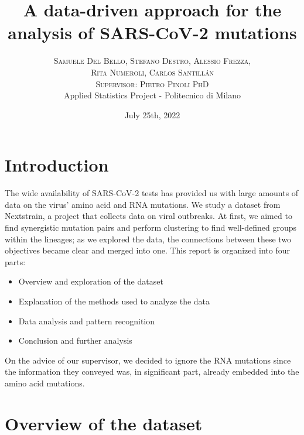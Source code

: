 \documentclass[twoside,twocolumn]{article}
\title{A data-driven approach for the analysis of SARS-CoV-2 mutations} %
\author{%
	\textsc{Samuele Del Bello, Stefano Destro, Alessio Frezza,}\\
	\textsc{Rita Numeroli, Carlos Santillán} \\[1ex] %
	\textsc{Supervisor: Pietro Pinoli PhD}\\
	\normalsize  Applied Statistics Project - Politecnico di Milano \\
}
\date{July 25th, 2022}
\begin{document}
	\maketitle
	
	\section{Introduction}
	
	The wide availability of SARS-CoV-2 tests has provided us with large amounts of data on the virus' amino acid and RNA mutations. We study a dataset from Nextstrain\cite{nextstrainbook}, a project that collects data on viral outbreaks. At first, we aimed to find synergistic mutation pairs and perform clustering to find well-defined groups within the lineages; as we explored the data, the connections between these two objectives became clear and merged into one. This report is organized into four parts:
	\begin{itemize}
		\item Overview and exploration of the dataset 
		\item Explanation of the methods used to analyze the data
		\item Data analysis and pattern recognition
		\item Conclusion and further analysis
	\end{itemize}
	On the advice of our supervisor, we decided to ignore the RNA mutations since the information they conveyed was, in significant part, already embedded into the amino acid mutations.
	
	\section{Overview of the dataset}
	
\end{document}
